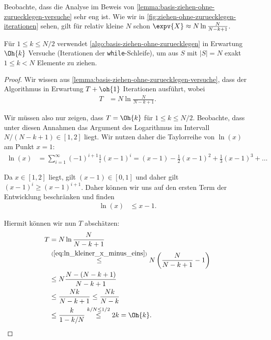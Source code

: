 \vspace{-3ex}
Beobachte, dass die Analyse im Beweis von \cref{lemma:basis-ziehen-ohne-zuruecklegen-versuche} sehr eng ist.
Wie wir in \cref{fig:ziehen-ohne-zuruecklegen-iterationen} sehen, gilt für relativ kleine $N$ schon $\expv{X} \approx N \ln \frac{N}{N - k + 1}$.

\begin{theorem}\label{thm:ziehen-ohne-zuruecklegen-k}
    Für $1 \le k \le N/2$ verwendet \cref{algo:basis-ziehen-ohne-zuruecklegen} in Erwartung $\Oh{k}$ Versuche (Iterationen der \texttt{while}-Schleife), um aus $S$ mit $|S| = N$ exakt $1 \le k < N$ Elemente zu ziehen.
\end{theorem}

\begin{proof}
    Wir wissen aus \cref{lemma:basis-ziehen-ohne-zuruecklegen-versuche}, dass der Algorithmus in Erwartung $T + \oh{1}$ Iterationen ausführt, wobei
    \begin{align}
        T & = N \ln \frac{N}{N - k + 1}.
    \end{align}

    \noindent
    Wir müssen also nur zeigen, dass $T = \Oh{k}$ für $1 \le k \le N/2$.
    Beobachte, dass unter diesen Annahmen das Argument des Logarithmus im Intervall $N/(N - k + 1) \in [1, 2]$ liegt.
    Wir nutzen daher die Taylorreihe von $\ln(x)$ am Punkt $x=1$:
    \begin{align}
        \ln(x) & = \sum_{i=1}^\infty (-1)^{i+1} \frac{1}{i} (x - 1)^i = (x-1) - \frac 1 2 (x-1)^2 + \frac 1 3 (x - 1)^3 + \ldots
    \end{align}

    \noindent
    Da $x \in [1,2]$ liegt, gilt $(x-1) \in [0, 1]$ und daher gilt $(x-1)^i \ge (x-1)^{i+1}$.
    Daher können wir uns auf den ersten Term der Entwicklung beschränken und finden
    \begin{align}\label{eq:ln_kleiner_x_minus_eins}
        \ln(x) & \le x - 1.
    \end{align}

    \noindent
    Hiermit können wir nun $T$ abschätzen:
    \begin{align}
        T & = N \ln \frac{N}{N - k + 1}                                                                \\
          & \stackrel{(\ref{eq:ln_kleiner_x_minus_eins})}{\le} N \left( \frac{N}{N - k + 1}  - 1 \right) \\
          & \le N \frac{N - (N - k + 1)}{N - k + 1}                                                    \\
& \le \frac{Nk}{N-k+1}
\le \frac{Nk}{N-k}                                                                             \\
& \le \frac{k}{1-k/N}
\stackrel{k/N \le 1/2}\le 2k = \Oh{k}. \hfill \qedhere
    \end{align}
\end{proof}

